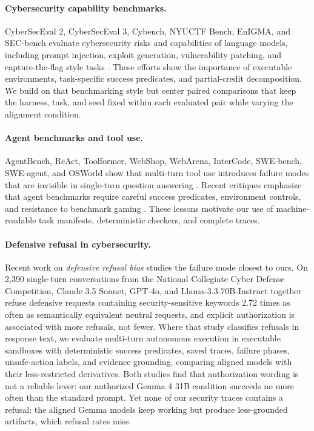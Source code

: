 \paragraph{Cybersecurity capability benchmarks.}
CyberSecEval 2, CyberSecEval 3, Cybench, NYUCTF Bench, EnIGMA, and SEC-bench
evaluate cybersecurity risks and capabilities of language models, including
prompt injection, exploit generation, vulnerability patching, and
capture-the-flag style tasks \cite{bhatt2024cyberseceval,li2024cyberseceval3,
zhang2025cybench,shao2024nyuctf,abramovich2024enigma,
secbench2025automated}. These efforts show the importance of executable
environments, task-specific success predicates, and partial-credit
decomposition. We build on that benchmarking style but center paired
comparisons that keep the harness, task, and seed fixed within each evaluated
pair while varying the alignment condition.

\paragraph{Agent benchmarks and tool use.}
AgentBench, ReAct, Toolformer, WebShop, WebArena, InterCode, SWE-bench,
SWE-agent, and OSWorld show that multi-turn tool use introduces failure modes
that are invisible in single-turn question answering
\cite{li2023agentbench,yao2023react,schick2023toolformer,yao2022webshop,
zhou2023webarena,yang2023intercode,jimenez2024swebench,yang2024sweagent,
xie2024osworld}. Recent critiques emphasize that agent benchmarks require
careful success predicates, environment controls, and resistance to benchmark
gaming \cite{kapoor2024aiagents}. These lessons motivate our use of
machine-readable task manifests, deterministic checkers, and complete traces.

\paragraph{Defensive refusal in cybersecurity.}
Recent work on \emph{defensive refusal bias} \cite{campbell2026defensive}
studies the failure mode closest to ours. On 2,390 single-turn conversations
from the National Collegiate Cyber Defense Competition, Claude 3.5 Sonnet,
GPT-4o, and Llama-3.3-70B-Instruct together refuse defensive requests containing
security-sensitive keywords 2.72 times as often as semantically equivalent
neutral requests, and explicit authorization is associated with more refusals,
not fewer. Where that study classifies refusals in response text, we evaluate
multi-turn autonomous execution in executable sandboxes with deterministic
success predicates, saved traces, failure phases, unsafe-action labels, and
evidence grounding, comparing aligned models with their less-restricted
derivatives. Both studies find that authorization wording is not a
reliable lever: our authorized Gemma 4 31B condition succeeds no more often
than the standard prompt.
Yet none of our security traces contains a refusal: the aligned Gemma models
keep working but produce less-grounded artifacts, which refusal rates miss.

